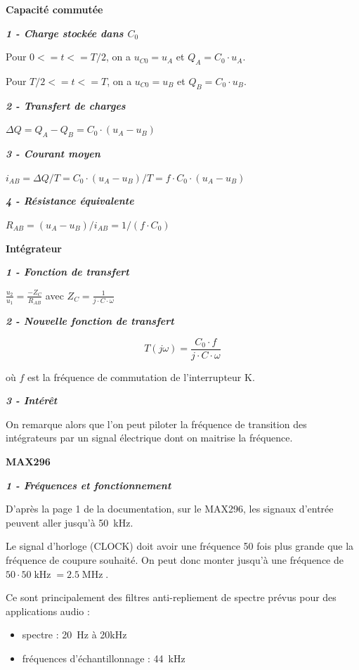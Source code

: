 \documentclass[a4paper,french]{paper}
\begin{document}
\textbf{Capacité commutée}

\textbf{\textit{1 - Charge stockée dans $C_0$}}

Pour $0 <= t <= T/2$, on a $u_{C0} = u_A$ et $Q_A = C_0 \cdot u_A$.

Pour $T/2 <= t <= T$, on a $u_{C0} = u_B$ et $Q_B = C_0 \cdot u_B$.

\textbf{\textit{2 - Transfert de charges}}

$\Delta{}Q = Q_A - Q_B = C_0 \cdot (u_A - u_B)$

\textbf{\textit{3 - Courant moyen}}

$i_{AB} = \Delta{}Q / T = C_0 \cdot (u_A - u_B) / T = f \cdot C_0 \cdot (u_A - u_B)$

\textbf{\textit{4 - Résistance équivalente}}

$R_{AB} = (u_A - u_B) / i_{AB} = 1 / (f \cdot C_0)$

\medskip

\textbf{Intégrateur}

\textbf{\textit{1 - Fonction de transfert}}

$\frac{u_2}{u_1} = \frac{-Z_C}{R_{AB}}$ avec $Z_C = \frac{1}{j \cdot C \cdot \omega}$

\textbf{\textit{2 - Nouvelle fonction de transfert}}

$$\boxed{T(j\omega) = \frac{C_0 \cdot f}{j \cdot C \cdot \omega}}$$
	
	où $f$ est la fréquence de commutation de l'interrupteur K.

\textbf{\textit{3 - Intérêt}}

On remarque alors que l'on peut piloter la fréquence de transition des intégrateurs par un signal électrique dont on maitrise la fréquence.

\newpage
\textbf{MAX296}

\textbf{\textit{1 - Fréquences et fonctionnement}}

D'après la page 1 de la documentation, sur le MAX296, les signaux d'entrée peuvent aller jusqu'à 50~kHz.

Le signal d'horloge (\textsc{CLOCK}) doit avoir une fréquence 50 fois plus grande que la fréquence de coupure souhaité. On peut donc monter jusqu'à une fréquence de $50 \cdot 50\operatorname{kHz} = 2.5\operatorname{MHz}$.

Ce sont principalement des filtres anti-repliement de spectre prévus pour des applications audio :
\begin{itemize}
	\item spectre : 20~Hz à 20kHz
	\item fréquences d'échantillonnage : 44~kHz
\end{itemize} 
\end{document}
